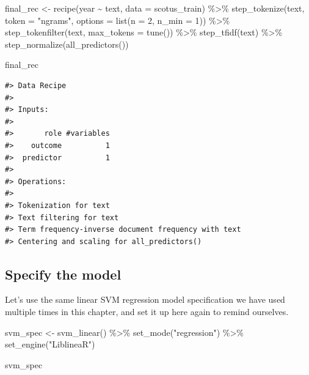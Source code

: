 \documentclass[
]{krantz}
\makeatletter
\newenvironment{Shaded}{\begin{snugshade}}{\end{snugshade}}
\newcommand{\AttributeTok}[1]{\textcolor[rgb]{0.77,0.63,0.00}{#1}}
\newcommand{\DecValTok}[1]{\textcolor[rgb]{0.00,0.00,0.81}{#1}}
\newcommand{\FunctionTok}[1]{\textcolor[rgb]{0.00,0.00,0.00}{#1}}
\newcommand{\NormalTok}[1]{#1}
\newcommand{\OtherTok}[1]{\textcolor[rgb]{0.56,0.35,0.01}{#1}}
\newcommand{\SpecialCharTok}[1]{\textcolor[rgb]{0.00,0.00,0.00}{#1}}
\newcommand{\StringTok}[1]{\textcolor[rgb]{0.31,0.60,0.02}{#1}}
\newenvironment{kframe}{%
\medskip{}
\setlength{\fboxsep}{.8em}
 \def\at@end@of@kframe{}%
 \ifinner\ifhmode%
  \def\at@end@of@kframe{\end{minipage}}%
  \begin{minipage}{\columnwidth}%
 \fi\fi%
 \def\FrameCommand##1{\hskip\@totalleftmargin \hskip-\fboxsep
 \colorbox{shadecolor}{##1}\hskip-\fboxsep
     \hskip-\linewidth \hskip-\@totalleftmargin \hskip\columnwidth}%
 \MakeFramed {\advance\hsize-\width
   \@totalleftmargin\z@ \linewidth\hsize
   \@setminipage}}%
 {\par\unskip\endMakeFramed%
 \at@end@of@kframe}
\renewenvironment{Shaded}{\begin{kframe}}{\end{kframe}}
\makeatother
\begin{document}
\begin{Shaded}
\begin{Highlighting}[]
\NormalTok{final\_rec }\OtherTok{\textless{}{-}} \FunctionTok{recipe}\NormalTok{(year }\SpecialCharTok{\textasciitilde{}}\NormalTok{ text, }\AttributeTok{data =}\NormalTok{ scotus\_train) }\SpecialCharTok{\%\textgreater{}\%}
  \FunctionTok{step\_tokenize}\NormalTok{(text, }\AttributeTok{token =} \StringTok{"ngrams"}\NormalTok{, }\AttributeTok{options =} \FunctionTok{list}\NormalTok{(}\AttributeTok{n =} \DecValTok{2}\NormalTok{, }\AttributeTok{n\_min =} \DecValTok{1}\NormalTok{)) }\SpecialCharTok{\%\textgreater{}\%}
  \FunctionTok{step\_tokenfilter}\NormalTok{(text, }\AttributeTok{max\_tokens =} \FunctionTok{tune}\NormalTok{()) }\SpecialCharTok{\%\textgreater{}\%}
  \FunctionTok{step\_tfidf}\NormalTok{(text) }\SpecialCharTok{\%\textgreater{}\%}
  \FunctionTok{step\_normalize}\NormalTok{(}\FunctionTok{all\_predictors}\NormalTok{())}

\NormalTok{final\_rec}
\end{Highlighting}
\end{Shaded}

\begin{verbatim}
#> Data Recipe
#> 
#> Inputs:
#> 
#>       role #variables
#>    outcome          1
#>  predictor          1
#> 
#> Operations:
#> 
#> Tokenization for text
#> Text filtering for text
#> Term frequency-inverse document frequency with text
#> Centering and scaling for all_predictors()
\end{verbatim}

\hypertarget{specify-the-model}{%
\subsection{Specify the model}\label{specify-the-model}}

Let's use the same linear SVM regression model specification we have used multiple times in this chapter, and set it up here again to remind ourselves.

\begin{Shaded}
\begin{Highlighting}[]
\NormalTok{svm\_spec }\OtherTok{\textless{}{-}} \FunctionTok{svm\_linear}\NormalTok{() }\SpecialCharTok{\%\textgreater{}\%}
  \FunctionTok{set\_mode}\NormalTok{(}\StringTok{"regression"}\NormalTok{) }\SpecialCharTok{\%\textgreater{}\%}
  \FunctionTok{set\_engine}\NormalTok{(}\StringTok{"LiblineaR"}\NormalTok{)}

\NormalTok{svm\_spec}
\end{Highlighting}
\end{Shaded}
\end{document}
